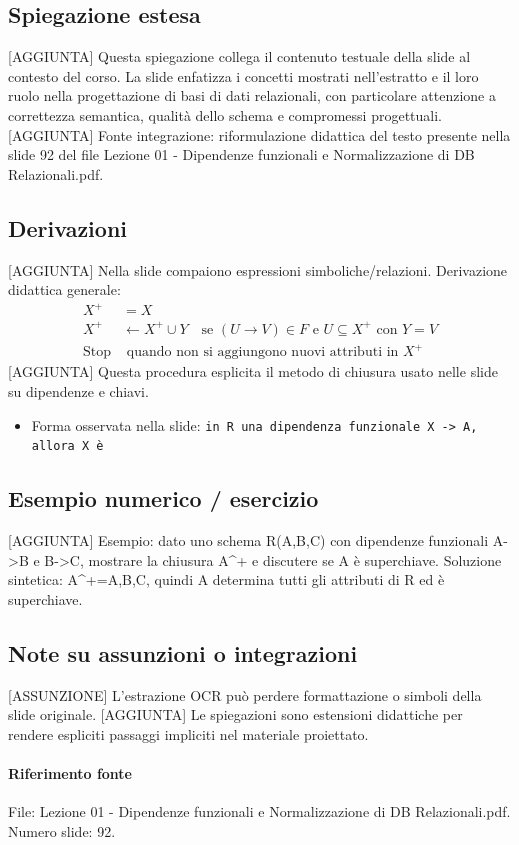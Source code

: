 \documentclass[11pt]{article}
\begin{document}
\subsection*{Spiegazione estesa}
[AGGIUNTA] Questa spiegazione collega il contenuto testuale della slide al contesto del corso. La slide enfatizza i concetti mostrati nell'estratto e il loro ruolo nella progettazione di basi di dati relazionali, con particolare attenzione a correttezza semantica, qualità dello schema e compromessi progettuali.
[AGGIUNTA] Fonte integrazione: riformulazione didattica del testo presente nella slide 92 del file Lezione 01 - Dipendenze funzionali e Normalizzazione di DB Relazionali.pdf.
\subsection*{Derivazioni}
[AGGIUNTA] Nella slide compaiono espressioni simboliche/relazioni. Derivazione didattica generale:
\begin{align*}
X^+ &= X \\
X^+ &\leftarrow X^+ \cup Y \quad \text{se } (U \to V) \in F \text{ e } U \subseteq X^+ \text{ con } Y=V \\
\text{Stop} &\text{ quando non si aggiungono nuovi attributi in } X^+
\end{align*}
[AGGIUNTA] Questa procedura esplicita il metodo di chiusura usato nelle slide su dipendenze e chiavi.
\begin{itemize}[leftmargin=*]
\item Forma osservata nella slide: \texttt{in R una dipendenza funzionale X -> A, allora X è}
\end{itemize}
\subsection*{Esempio numerico / esercizio}
[AGGIUNTA] Esempio: dato uno schema R(A,B,C) con dipendenze funzionali A->B e B->C, mostrare la chiusura A^+ e discutere se A è superchiave. Soluzione sintetica: A^+={A,B,C}, quindi A determina tutti gli attributi di R ed è superchiave.
\subsection*{Note su assunzioni o integrazioni}
[ASSUNZIONE] L'estrazione OCR può perdere formattazione o simboli della slide originale.
[AGGIUNTA] Le spiegazioni sono estensioni didattiche per rendere espliciti passaggi impliciti nel materiale proiettato.
\paragraph{Riferimento fonte} File: Lezione 01 - Dipendenze funzionali e Normalizzazione di DB Relazionali.pdf. Numero slide: 92.
\end{document}
